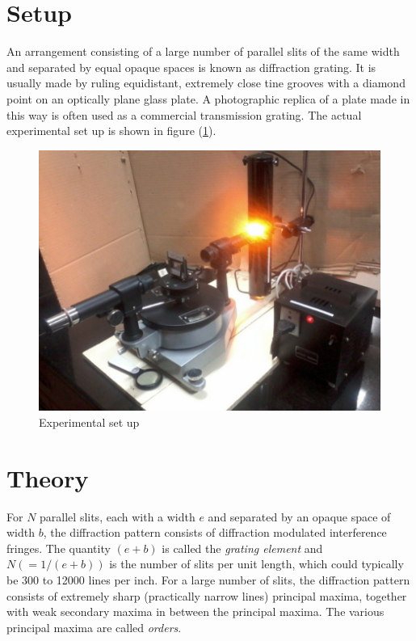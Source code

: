 \documentclass{article}
\begin{document}
\section{Setup}
\noindent
An arrangement consisting of a large number of parallel slits of the same width and 
separated by equal opaque spaces is known as diffraction grating. It is usually made by 
ruling equidistant, extremely close tine grooves with a diamond point on an optically
plane glass plate. A photographic replica of a plate made in this way is often used as a commercial transmission grating. The actual experimental set up is shown in figure (\ref{fig:setup}).
\begin{figure}[]
    \centering
    \includegraphics[scale = 0.65]{Figures/setup.png}
    \captionsetup{justification=centering}
    \caption{Experimental set up}
    \label{fig:setup}
\end{figure}



\section{Theory}
\noindent 
For $N$ parallel slits, each with a width $e$ and separated by an opaque space of width 
$b$, the diffraction pattern consists of diffraction modulated interference fringes. The quantity $(e+b)$ is called the \textit{grating element} and $N (= 1 / (e+b))$ is the number of slits per unit length, which could typically be 300 to 12000 lines per inch. For a large number of slits, the diffraction pattern consists of extremely sharp (practically narrow lines) principal maxima, together with weak secondary maxima in between the principal maxima. The various principal maxima are called \textit{orders}. 
\end{document}
